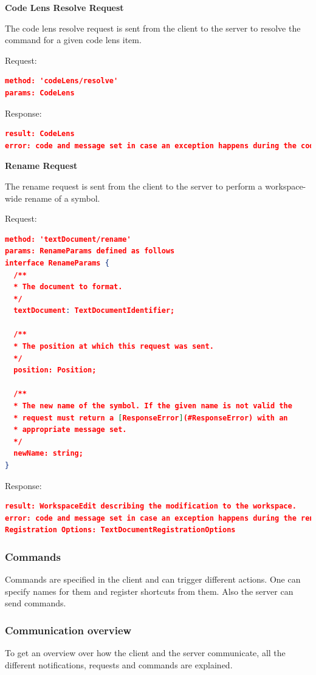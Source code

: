 \textbf{Code Lens Resolve Request}

The code lens resolve request is sent from the client to the server to resolve the command for a given code lens item.

Request:
\begin{lstlisting}[language=json,firstnumber=1]
method: 'codeLens/resolve'
params: CodeLens
\end{lstlisting}

Response:
\begin{lstlisting}[language=json,firstnumber=1]
result: CodeLens
error: code and message set in case an exception happens during the code lens resolve request.
\end{lstlisting}

\textbf{Rename Request}

The rename request is sent from the client to the server to perform a workspace-wide rename of a symbol.

Request:
\begin{lstlisting}[language=json,firstnumber=1]
method: 'textDocument/rename'
params: RenameParams defined as follows
interface RenameParams {
  /**
  * The document to format.
  */
  textDocument: TextDocumentIdentifier;

  /**
  * The position at which this request was sent.
  */
  position: Position;

  /**
  * The new name of the symbol. If the given name is not valid the
  * request must return a [ResponseError](#ResponseError) with an
  * appropriate message set.
  */
  newName: string;
}
\end{lstlisting}
Response:
\begin{lstlisting}[language=json,firstnumber=1]
result: WorkspaceEdit describing the modification to the workspace.
error: code and message set in case an exception happens during the rename request.
Registration Options: TextDocumentRegistrationOptions
\end{lstlisting}

\subsubsection{Commands}
Commands are specified in the client and can trigger different actions. One can specify names for them and register shortcuts from them. Also the server can send commands. 

\subsubsection{Communication overview}\label{custom commands}
To get an overview over how the client and the server communicate, all the different notifications, requests and commands are explained. 


